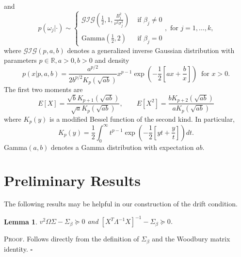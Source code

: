\documentclass[12pt]{article}
\newtheorem{lemma}[theorem]{Lemma}
\newcounter{ProofCounter}
\newenvironment{Proof}{\stepcounter{ProofCounter}\textsc{Proof.}}{\hfill$\square$}
\begin{document}
and 
\[
  p(\omega_j|\cdot) \sim \left\{ \begin{array}{cl}
      \mathcal{GIG}\left( \frac{1}{2}, 1, \frac{B_j^2}{\nu^2\sigma_j^2} \right) & \text{ if } \beta_j \neq 0 \\ \\
      \text{Gamma}\left( \frac{1}{2}, 2 \right) & \text{ if } \beta_j = 0
  \end{array} \right.,
  \text{ for } j=1,\dots,k,
\]
where $\mathcal{GIG}(p, a, b)$ denotes a generalized inverse Gaussian distribution with parameters $p \in \mathbb{R}, a > 0, b > 0$ and density
\[
  p(x|p, a, b) = \frac{a^{p/2}}{2b^{p/2}K_{p}(\sqrt{ab})}x^{p - 1}\exp\left( -\frac{1}{2}\left[ ax + \frac{b}{x} \right] \right) \ \text{ for } x > 0.
\]
The first two moments are
\[
  E[X] = \frac{\sqrt{b}K_{p+1}(\sqrt{ab})}{\sqrt{a}K_{p}(\sqrt{ab})}, \qquad E[X^2] = \frac{bK_{p+2}(\sqrt{ab})}{aK_{p}(\sqrt{ab})}
\]
where $K_{p}(y)$ is a modified Bessel function of the second kind. In particular, 
\begin{equation}
  K_p(y) = \frac{1}{2} \int_{0}^{\infty} t^{p-1}\exp\left( -\frac{1}{2}\left[yt + \frac{y}{t}\right] \right) dt.
  \label{eq1}
\end{equation}
Gamma$(a,b)$ denotes a Gamma distribution with expectation $ab$.


\section{Preliminary Results}

The following results may be helpful in our construction of the drift condition. \\

\begin{lemma}
  $v^2 \Omega \Sigma - \Sigma_{\beta} \succeq 0$ and $[X^T \Lambda^{-1}X]^{-1} - \Sigma_{\beta} \succeq 0$.
  \label{l1}
\end{lemma}
\begin{Proof}
  Follows directly from the definition of $\Sigma_{\beta}$ and the Woodbury matrix identity.
\end{Proof} \\
\end{document}
